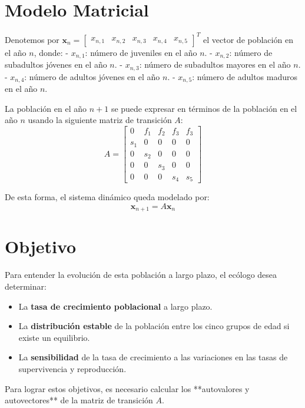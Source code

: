 \documentclass{article}
\begin{document}
\section*{Modelo Matricial}

Denotemos por \( \mathbf{x}_n = \begin{bmatrix} x_{n,1} & x_{n,2} & x_{n,3} & x_{n,4} & x_{n,5} \end{bmatrix}^T \) el vector de población en el año \( n \), donde:
- \( x_{n,1} \): número de juveniles en el año \( n \).
- \( x_{n,2} \): número de subadultos jóvenes en el año \( n \).
- \( x_{n,3} \): número de subadultos mayores en el año \( n \).
- \( x_{n,4} \): número de adultos jóvenes en el año \( n \).
- \( x_{n,5} \): número de adultos maduros en el año \( n \).

La población en el año \( n+1 \) se puede expresar en términos de la población en el año \( n \) usando la siguiente matriz de transición \( A \):
\[
A = \begin{bmatrix} 0 & f_1 & f_2 & f_3 & f_3 \\ s_1 & 0 & 0 & 0 & 0 \\ 0 & s_2 & 0 & 0 & 0 \\ 0 & 0 & s_3 & 0 & 0 \\ 0 & 0 & 0 & s_4 & s_5 \end{bmatrix}
\]

De esta forma, el sistema dinámico queda modelado por:
\[
\mathbf{x}_{n+1} = A \mathbf{x}_n
\]

\section*{Objetivo}

Para entender la evolución de esta población a largo plazo, el ecólogo desea determinar:
\begin{itemize}
    \item La \textbf{tasa de crecimiento poblacional} a largo plazo.
    \item La \textbf{distribución estable} de la población entre los cinco grupos de edad si existe un equilibrio.
    \item La \textbf{sensibilidad} de la tasa de crecimiento a las variaciones en las tasas de supervivencia y reproducción.
\end{itemize}

Para lograr estos objetivos, es necesario calcular los **autovalores y autovectores** de la matriz de transición \( A \).
\end{document}
